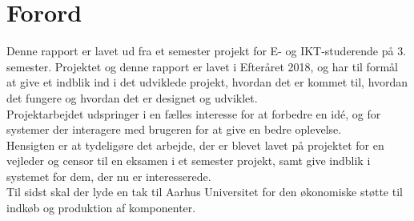 \documentclass[Rapport/Rapport_main.tex]{subfiles}
\begin{document}
\section{Forord}
Denne rapport er lavet ud fra et semester projekt for E- og IKT-studerende på 3. semester. Projektet og denne rapport er lavet i Efteråret 2018, og har til formål at give et indblik ind i det udviklede projekt, hvordan det er kommet til, hvordan det fungere og hvordan det er designet og udviklet. 
\\Projektarbejdet udspringer i en fælles interesse for at forbedre en idé, og for systemer der interagere med brugeren for at give en bedre oplevelse.  
\\Hensigten er at tydeligøre det arbejde, der er blevet lavet på projektet for en vejleder og censor til en eksamen i et semester projekt, samt give indblik i systemet for dem, der nu er interesserede.
\\Til sidst skal der lyde en tak til Aarhus Universitet for den økonomiske støtte til indkøb og produktion af komponenter.
\end{document}
